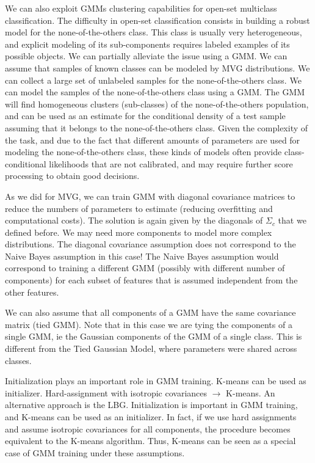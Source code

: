 We can also exploit GMMs clustering capabilities for open-set multiclass classification. The difficulty in open-set classification consists in building a robust model for the none-of-the-others class. This class is usually very heterogeneous, and explicit modeling of its sub-components requires labeled examples of its possible objects. We can partially alleviate the issue using a GMM. We can assume that samples of known classes can be modeled by MVG distributions. We can collect a large set of unlabeled samples for the none-of-the-others class. We can model the samples of the none-of-the-others class using a GMM. The GMM will find homogeneous clusters (sub-classes) of the none-of-the-others population, and can be used as an estimate for the conditional density of a test sample assuming that it belongs to the none-of-the-others class. Given the complexity of the task, and due to the fact that different amounts of parameters are used for modeling the none-of-the-others class, these kinds of models often provide class-conditional likelihoods that are not calibrated, and may require further score processing to obtain good decisions.

As we did for MVG, we can train GMM with diagonal covariance matrices to reduce the numbers of parameters to estimate (reducing overfitting and computational costs). The solution is again given by the diagonals of $\Sigma_c$ that we defined before. We may need more components to model more complex distributions. The diagonal covariance assumption does not correspond to the Naive Bayes assumption in this case! The Naive Bayes assumption would correspond to training a different GMM (possibly with different number of components) for each subset of features that is assumed independent from the other features.

We can also assume that all components of a GMM have the same covariance matrix (tied GMM). Note that in this case we are tying the components of a single GMM, ie the Gaussian components of the GMM of a single class. This is different from the Tied Gaussian Model, where parameters were shared across classes.

Initialization plays an important role in GMM training. K-means can be used as initializer. Hard-assignment with isotropic covariances $\rightarrow$ K-means. An alternative approach is the LBG. Initialization is important in GMM training, and K-means can be used as an initializer. In fact, if we use hard assignments and assume isotropic covariances for all components, the procedure becomes equivalent to the K-means algorithm. Thus, K-means can be seen as a special case of GMM training under these assumptions.

